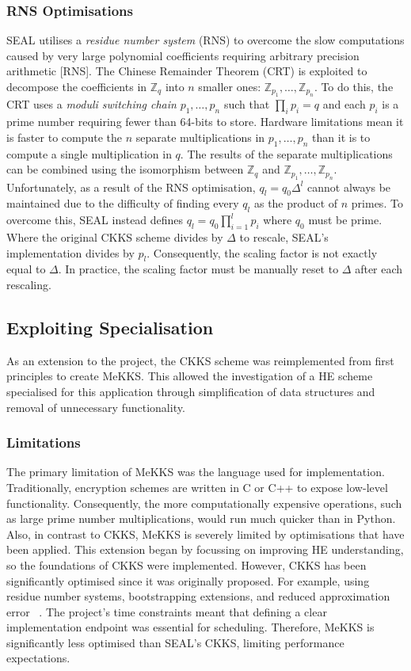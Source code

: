 \subsubsection{RNS Optimisations}
\indent \indent
SEAL utilises a \textit{residue number system} (RNS) to overcome the slow computations caused by very large polynomial coefficients requiring arbitrary precision arithmetic [RNS]. The Chinese Remainder Theorem (CRT) is exploited to decompose the coefficients in $\mathbb{Z}_q$ into $n$ smaller ones: $\mathbb{Z}_{p_1}, \ldots, \mathbb{Z}_{p_n}$. To do this, the CRT uses a \textit{moduli switching chain} $p_1, \ldots, p_n$ such that $\prod_i p_i = q$ and each $p_i$ is a prime number requiring fewer than 64-bits to store. Hardware limitations mean it is faster to compute the $n$ separate multiplications in $p_1, \ldots, p_n$ than it is to compute a single multiplication in $q$. The results of the separate multiplications can be combined using the isomorphism between $\mathbb{Z}_q$ and $\mathbb{Z}_{p_1}, \ldots, \mathbb{Z}_{p_n}$.
\smallskip \\ \indent
Unfortunately, as a result of the RNS optimisation, $q_l = q_0 \Delta^l$ cannot always be maintained due to the difficulty of finding every $q_l$ as the product of $n$ primes. To overcome this, SEAL instead defines $q_l = q_0 \prod_{i=1}^l p_i$ where $q_0$ must be prime. Where the original CKKS scheme divides by $\Delta$ to rescale, SEAL's implementation divides by $p_l$. Consequently, the scaling factor is not exactly equal to $\Delta$. In practice, the scaling factor must be manually reset to $\Delta$ after each rescaling.
\subsection{Exploiting Specialisation}
\label{sec:mekks}
\indent \indent
As an extension to the project, the CKKS scheme was reimplemented from first principles to create MeKKS. This allowed the investigation of a HE scheme specialised for this application through simplification of data structures and removal of unnecessary functionality.
\subsubsection{Limitations}
\label{sec:mekksLimitations}
\indent \indent
The primary limitation of MeKKS was the language used for implementation. Traditionally, encryption schemes are written in C or C++ to expose low-level functionality. Consequently, the more computationally expensive operations, such as large prime number multiplications, would run much quicker than in Python.
\smallskip \\ \indent
Also, in contrast to CKKS, MeKKS is severely limited by optimisations that have been applied. This extension began by focussing on improving HE understanding, so the foundations of CKKS were implemented. However, CKKS has been significantly optimised since it was originally proposed. For example, using residue number systems, bootstrapping extensions, and reduced approximation error ~\cite{RNS, BootstrappingHEAAN, RAE}. The project's time constraints meant that defining a clear implementation endpoint was essential for scheduling. Therefore, MeKKS is significantly less optimised than SEAL's CKKS, limiting performance expectations.
